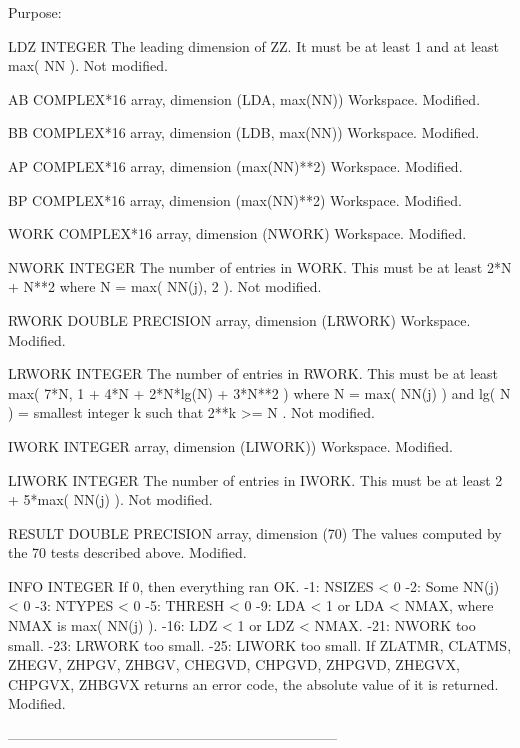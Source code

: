 \begin{DoxyParagraph}{Purpose\+: }
\begin{DoxyVerb}
  LDZ     INTEGER
          The leading dimension of ZZ.  It must be at least 1 and
          at least max( NN ).
          Not modified.

  AB      COMPLEX*16 array, dimension (LDA, max(NN))
          Workspace.
          Modified.

  BB      COMPLEX*16 array, dimension (LDB, max(NN))
          Workspace.
          Modified.

  AP      COMPLEX*16 array, dimension (max(NN)**2)
          Workspace.
          Modified.

  BP      COMPLEX*16 array, dimension (max(NN)**2)
          Workspace.
          Modified.

  WORK    COMPLEX*16 array, dimension (NWORK)
          Workspace.
          Modified.

  NWORK   INTEGER
          The number of entries in WORK.  This must be at least
          2*N + N**2  where  N = max( NN(j), 2 ).
          Not modified.

  RWORK   DOUBLE PRECISION array, dimension (LRWORK)
          Workspace.
          Modified.

  LRWORK  INTEGER
          The number of entries in RWORK.  This must be at least
          max( 7*N, 1 + 4*N + 2*N*lg(N) + 3*N**2 ) where
          N = max( NN(j) ) and lg( N ) = smallest integer k such
          that 2**k >= N .
          Not modified.

  IWORK   INTEGER array, dimension (LIWORK))
          Workspace.
          Modified.

  LIWORK  INTEGER
          The number of entries in IWORK.  This must be at least
          2 + 5*max( NN(j) ).
          Not modified.

  RESULT  DOUBLE PRECISION array, dimension (70)
          The values computed by the 70 tests described above.
          Modified.

  INFO    INTEGER
          If 0, then everything ran OK.
           -1: NSIZES < 0
           -2: Some NN(j) < 0
           -3: NTYPES < 0
           -5: THRESH < 0
           -9: LDA < 1 or LDA < NMAX, where NMAX is max( NN(j) ).
          -16: LDZ < 1 or LDZ < NMAX.
          -21: NWORK too small.
          -23: LRWORK too small.
          -25: LIWORK too small.
          If  ZLATMR, CLATMS, ZHEGV, ZHPGV, ZHBGV, CHEGVD, CHPGVD,
              ZHPGVD, ZHEGVX, CHPGVX, ZHBGVX returns an error code,
              the absolute value of it is returned.
          Modified.

-----------------------------------------------------------------------


\end{DoxyVerb}
\end{DoxyParagraph}
